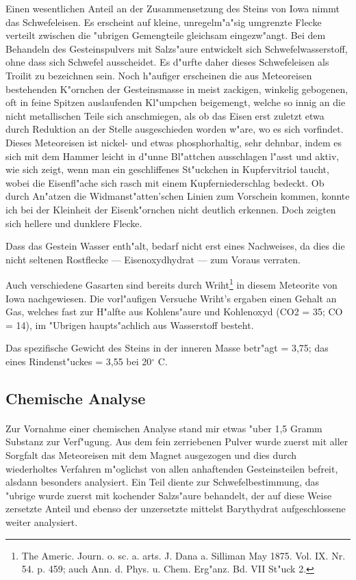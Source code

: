 \documentclass[a4paper, 11pt, oneside]{article}
\begin{document}
Einen wesentlichen Anteil an der Zusammensetzung des Steins von Iowa nimmt das Schwefeleisen. Es erscheint auf kleine, unregelm"a"sig umgrenzte Flecke verteilt zwischen die "ubrigen Gemengteile gleichsam eingezw"angt. Bei dem Behandeln des Gesteinspulvers mit Salzs"aure entwickelt sich Schwefelwasserstoff, ohne dass sich Schwefel ausscheidet. Es d"urfte daher dieses Schwefeleisen als Troilit zu bezeichnen sein. Noch h"aufiger erscheinen die aus Meteoreisen bestehenden K"ornchen der Gesteinsmasse in meist zackigen, winkelig gebogenen, oft in feine Spitzen auslaufenden Kl"umpchen beigemengt, welche so innig an die nicht metallischen Teile sich anschmiegen, als ob das Eisen erst zuletzt etwa durch Reduktion an der Stelle ausgeschieden worden w"are, wo es sich vorfindet. Dieses Meteoreisen ist nickel- und etwas phosphorhaltig, sehr dehnbar, indem es sich mit dem Hammer leicht in d"unne Bl"attchen ausschlagen l"asst und aktiv, wie sich zeigt, wenn man ein geschliffenes St"uckchen in Kupfervitriol taucht, wobei die Eisenfl"ache sich rasch mit einem Kupferniederschlag bedeckt. Ob durch An"atzen die Widmanst"atten’schen Linien zum Vorschein kommen, konnte ich bei der Kleinheit der Eisenk"ornchen nicht deutlich erkennen. Doch zeigten sich hellere und dunklere Flecke.

Dass das Gestein Wasser enth"alt, bedarf nicht erst eines Nachweises, da dies die nicht seltenen Rostflecke --- Eisenoxydhydrat --- zum Voraus verraten.

Auch verschiedene Gasarten sind bereits durch Wriht\footnote{The Americ. Journ. o. sc. a. arts. J. Dana a. Silliman May 1875. Vol. IX. Nr. 54. p. 459; auch Ann. d. Phys. u. Chem. Erg"anz. Bd. VII St"uck 2.} in diesem Meteorite von Iowa nachgewiesen. Die vorl"aufigen Versuche Wriht's ergaben einen Gehalt an Gas, welches fast zur H"alfte aus Kohlens"aure und Kohlenoxyd (CO2 = 35; CO = 14), im "Ubrigen haupts"achlich aus Wasserstoff besteht.

Das spezifische Gewicht des Steins in der inneren Masse betr"agt = 3,75; das eines Rindenst"uckes = 3,55 bei 20$^{\circ}$ C.
\clearpage
\subsection{Chemische Analyse}
\paragraph{}
Zur Vornahme einer chemischen Analyse stand mir etwas "uber 1,5 Gramm Substanz zur Verf"ugung. Aus dem fein zerriebenen Pulver wurde zuerst mit aller Sorgfalt das Meteoreisen mit dem Magnet ausgezogen und dies durch wiederholtes Verfahren m"oglichst von allen anhaftenden Gesteinsteilen befreit, alsdann besonders analysiert. Ein Teil diente zur Schwefelbestimmung, das "ubrige wurde zuerst mit kochender Salzs"aure behandelt, der auf diese Weise zersetzte Anteil und ebenso der unzersetzte mittelst Barythydrat aufgeschlossene weiter analysiert.
\end{document}
